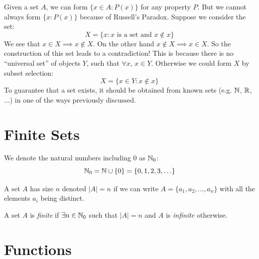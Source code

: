 \documentclass[../main.tex]{subfiles}
\begin{document}
\label{russelsParadox}
\begin{remark}[Warning]
  Given a set $A$, we can form $\{x \in A: P(x)\}$ for any property $P$.
  But we cannot always form $\{x: P(x)\}$ because of Russell's Paradox. Suppose we consider the set:
  \[
    X = \{x: x \text{ is a set and } x \notin x\}
  \]
  We see that $x \in X \implies x \notin X$.
  On the other hand $x \notin X \implies x \in X$.
  So the construction of this set leads to a contradiction!
  This is because there is no ``universal set'' of objects $Y$, such that $\forall x$, $x \in Y$.
  Otherwise we could form $X$ by subset selection:
  \[
    X = \{x \in Y: x \notin x\}
  \]
  To guarantee that a set exists, it should be obtained from known sets (e.g. $\mathbb{N}$, $\mathbb{R}$, $\ldots$) in one of the ways previously discussed.
\end{remark}
\section{Finite Sets}
\label{finiteSets}
\begin{remark}[Notation]
We denote the natural numbers including 0 as $\mathbb{N}_0$:
\[
  \mathbb{N}_0 = \mathbb{N} \cup \{0\} = \{0, 1, 2, 3, \ldots\}
\]
\end{remark}
\begin{definition}
  A set $A$ has size $n$ denoted $|A| = n$ if we can write $A = \{a_1, a_2, \ldots, a_n\}$ with all the elements $a_i$ being distinct.
\end{definition}
\begin{definition}
  A set $A$ is \textit{finite} if $\exists n \in \mathbb{N}_0$ such that $|A| = n$ and $A$ is \textit{infinite} otherwise.
\end{definition}
\section{Functions}
\end{document}
